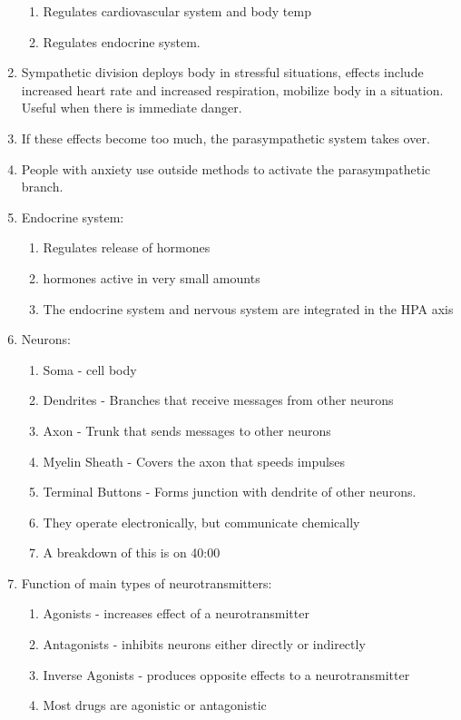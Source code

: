 \documentclass[12pt]{article}
\begin{document}
\begin{enumerate}
\begin{enumerate}
  \item Regulates cardiovascular system and body temp
  \item Regulates endocrine system.
  \end{enumerate}
\item Sympathetic division deploys body in stressful situations,
  effects include increased heart rate and increased respiration,
  mobilize body in a situation. Useful when there is immediate
  danger. 
\item If these effects become too much, the parasympathetic system
  takes over. 
\item People with anxiety use outside methods to activate the
  parasympathetic branch.
\item Endocrine system:
  \begin{enumerate}
  \item Regulates release of hormones
  \item hormones active in very small amounts
  \item The endocrine system and nervous system are integrated in the
    HPA axis
  \end{enumerate}
\item Neurons:
  \begin{enumerate}
  \item Soma - cell body
  \item Dendrites - Branches that receive messages from other neurons
  \item Axon - Trunk that sends messages to other neurons
  \item Myelin Sheath - Covers the axon that speeds impulses
  \item Terminal Buttons - Forms junction with dendrite of other
    neurons. 
  \item They operate electronically, but communicate chemically
  \item A breakdown of this is on 40:00
  \end{enumerate}
\item Function of main types of neurotransmitters:
  \begin{enumerate}
  \item Agonists - increases effect of a neurotransmitter
  \item Antagonists - inhibits neurons either directly or indirectly
  \item Inverse Agonists - produces opposite effects to a neurotransmitter
  \item Most drugs are agonistic or antagonistic

\end{enumerate}
\end{enumerate}
\end{document}

